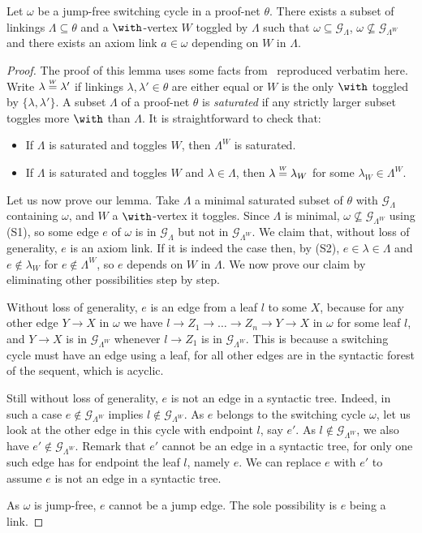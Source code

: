 \documentclass{lmcs}
\newcommand*{\G}{\mathcal{G}}
\newcommand{\symboltext}[2]{\mathrel{\overset{\makebox[0pt]{\mbox{\normalfont\tiny\sffamily \ensuremath{#1}}}}{#2}}} %
\newcommand{\eqtext}[1]{\symboltext{#1}{=}} %
\begin{document}
\begin{lem}
\label{lem:4.32+}
Let $\omega$ be a jump-free switching cycle in a proof-net $\theta$.
There exists a subset of linkings $\Lambda\subseteq\theta$ and a $\with$-vertex $W$ toggled by $\Lambda$ such that $\omega\subseteq\G_\Lambda$, $\omega\not\subseteq\G_{\Lambda^W}$ and there exists an axiom link $a\in\omega$ depending on $W$ in $\Lambda$.
\end{lem}
\begin{proof}
The proof of this lemma uses some facts from~\cite{mallpnlong} reproduced verbatim here.
Write $\lambda\eqtext{W}\lambda'$ if linkings $\lambda,\lambda'\in\theta$ are either equal or $W$ is the only $\with$ toggled by $\{\lambda,\lambda'\}$.
A subset $\Lambda$ of a proof-net $\theta$ is \emph{saturated} if any strictly larger subset toggles more $\with$ than $\Lambda$.
It is straightforward to check that:
\begin{itemize}[left=14pt]
\item[(S1)] If $\Lambda$ is saturated and toggles $W$, then $\Lambda^W$ is saturated.
\item[(S2)] If $\Lambda$ is saturated and toggles $W$ and $\lambda\in\Lambda$, then $\lambda\eqtext{W}\lambda_W$ for some $\lambda_W\in\Lambda^W$.
\end{itemize}

Let us now prove our lemma.
Take $\Lambda$ a minimal saturated subset of $\theta$ with $\G_\Lambda$ containing $\omega$, and $W$ a $\with$-vertex it toggles.
Since $\Lambda$ is minimal, $\omega\not\subseteq\G_{\Lambda^W}$ using (S1), so some edge $e$ of $\omega$ is in $\G_\Lambda$ but not in $\G_{\Lambda^W}$.
We claim that, without loss of generality, $e$ is an axiom link.
If it is indeed the case then, by (S2), $e\in\lambda\in\Lambda$ and $e\notin\lambda_W$ for $e\notin\Lambda^W$, so $e$ depends on $W$ in $\Lambda$.
We now prove our claim by eliminating other possibilities step by step.

Without loss of generality, $e$ is an edge from a leaf $l$ to some $X$, because for any other edge $Y\rightarrow X$ in $\omega$ we have $l\rightarrow Z_1\rightarrow\dots\rightarrow Z_n\rightarrow Y\rightarrow X$ in $\omega$ for some leaf $l$, and $Y\rightarrow X$ is in $\G_{\Lambda^W}$ whenever $l\rightarrow Z_1$ is in $\G_{\Lambda^W}$.
This is because a switching cycle must have an edge using a leaf, for all other edges are in the syntactic forest of the sequent, which is acyclic.

Still without loss of generality, $e$ is not an edge in a syntactic tree.
Indeed, in such a case $e\notin\G_{\Lambda^W}$ implies $l\notin\G_{\Lambda^W}$.
As $e$ belongs to the switching cycle $\omega$, let us look at the other edge in this cycle with endpoint $l$, say $e'$. As  $l\notin\G_{\Lambda^W}$, we also have $e'\notin\G_{\Lambda^W}$.
Remark that $e'$ cannot be an edge in a syntactic tree, for only one such edge has for endpoint the leaf $l$, namely $e$.
We can replace $e$ with $e'$ to assume $e$ is not an edge in a syntactic tree.

As $\omega$ is jump-free, $e$ cannot be a jump edge.
The sole possibility is $e$ being a link.
\end{proof}
\end{document}
